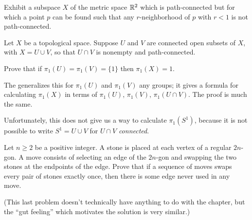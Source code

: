 \begin{problem}
	Exhibit a subspace $X$ of the metric space $\mathbb R^2$ which is
	path-connected but for which a point $p$ can be found such that
	any $r$-neighborhood of $p$ with $r < 1$ is not path-connected.
\end{problem}

\begin{dproblem}
	 \gim
	Let $X$ be a topological space.
	Suppose $U$ and $V$ are connected open subsets of $X$, with $X = U \cup V$,
	so that $U \cap V$ is nonempty and path-connected.

	Prove that if $\pi_1(U) = \pi_1(V) = \{1\}$ then $\pi_1(X) = 1$.
\end{dproblem}
\begin{remark}
	The  generalizes this
	for $\pi_1(U)$ and $\pi_1(V)$ any groups; it gives a formula for calculating $\pi_1(X)$
	in terms of $\pi_1(U)$, $\pi_1(V)$, $\pi_1(U \cap V)$.
	The proof is much the same.

	Unfortunately, this does not give us a way to calculate $\pi_1(S^1)$,
	because it is not possible to write $S^1 = U \cup V$ for $U \cap V$ \emph{connected}.
\end{remark}

\begin{problem}
	[RMM 2013] \yod
	Let $n \ge 2$ be a positive integer.
	A stone is placed at each vertex of a regular $2n$-gon.
	A move consists of selecting an edge of the $2n$-gon and swapping the two stones at the endpoints of the edge.
	Prove that if a sequence of moves swaps every pair of stones exactly once, then there is some edge never used in any move.
\end{problem}
(This last problem doesn't technically have anything to do with the chapter,
but the ``gut feeling'' which motivates the solution is very similar.)
